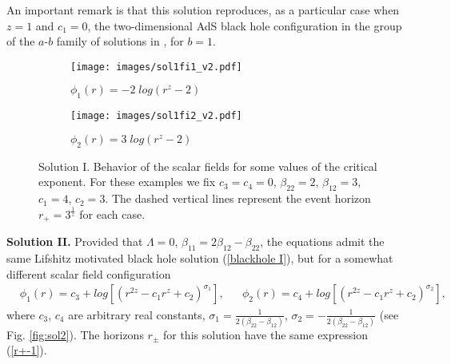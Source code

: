 \documentclass[sn-mathphys,Numbered]{sn-jnl}%
\theoremstyle{thmstyleone}%
\theoremstyle{thmstyletwo}%
\theoremstyle{thmstylethree}%
\begin{document}
An important remark is that this solution reproduces, as a particular case when $z=1$ and $c_1=0$, the two-dimensional AdS black hole configuration in the group of the $a$-$b$ family of solutions in \cite{Grumiller,Katanaev}, for $b=1$. 

\begin{figure} 
%
\begin{subfigure}{0.5\textwidth}
\texttt{[image: images/sol1fi1\_v2.pdf]}
\caption{$\phi_1(r)=-2\;log\left(r^{z}-2\right)$}
\label{fig:subim1}
\end{subfigure}
%
\begin{subfigure}{0.5\textwidth}
\texttt{[image: images/sol1fi2\_v2.pdf]}
\caption{$\phi_2(r)=3\;log\left(r^{z}-2\right)$}
\label{fig:subim2}
%
\end{subfigure}

\caption{Solution I. Behavior of the scalar fields for some values of the critical exponent. For these examples we fix $c_3=c_4=0$, $\beta_{22}=2$,  $\beta_{12}=3$, $c_1=4$, $c_2=3$. The dashed vertical lines represent the event horizon $r_+=3^{\frac{1}{z}}$ for each case.}
\label{fig:sol1}
\end{figure}

\textbf{Solution II.} Provided that $\Lambda=0$,  $\beta_{11}=2\beta_{12}-\beta_{22}$, the equations admit the same Lifshitz motivated black hole solution (\ref{blackhole I}), but for a somewhat different scalar field configuration
%
\begin{align}
    &\phi_1(r)= c_3+  log\left[ \left(r^{2z}-c_1 r^z+c_2\right)^{\sigma_1}\right], &
    &\phi_2(r)= c_4 + log\left[ \left(r^{2z}-c_1 r^z+c_2\right)^{\sigma_2}\right],
\end{align}
where $c_3$, $c_4$ are arbitrary real constants, $\sigma_1=\frac{1}{2\left(\beta_{22} -\beta_{12}\right)}$,  $\sigma_2=-\frac{1}{2\left(\beta_{22} -\beta_{12}\right)}$ (see Fig. \ref{fig:sol2}).
The horizons $r_{\pm}$ for this solution have the same expression (\ref{r+-1}).
\end{document}
